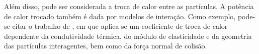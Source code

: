 Além disso, pode ser considerada a troca de calor entre as partículas. A potência de calor trocado também é dada por modelos de interação. Como exemplo, pode-se citar o trabalho de , em que aplica-se um coeficiente de troca de calor dependente da condutividade térmica, do módulo de elasticidade e da geometria das partículas interagentes, bem como da força normal de colisão.